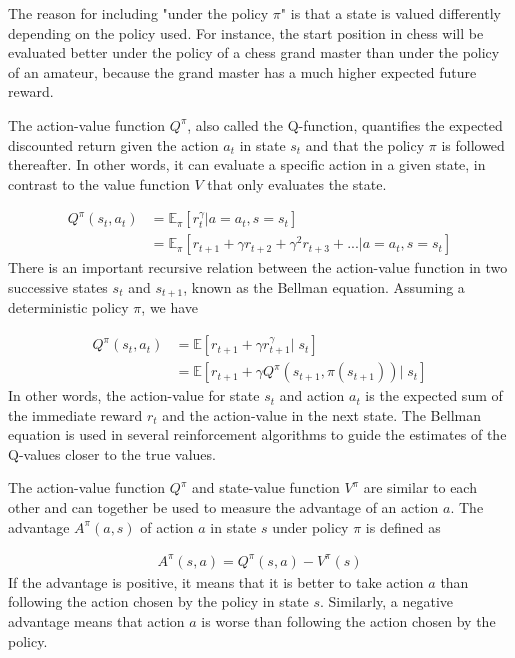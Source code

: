 \documentclass[class=book, crop=false, 11pt]{standalone}
\begin{document}
The reason for including "under the policy $\pi$" is that a state is valued differently depending on the policy used. For instance, the start position in chess will be evaluated better under the policy of a chess grand master than under the policy of an amateur, because the grand master has a much higher expected future reward. 



The action-value function $Q^{\pi}$, also called the Q-function, quantifies the expected discounted return given the action $a_{t}$ in state $s_{t}$ and that the policy $\pi$ is followed thereafter. In other words, it can evaluate a specific action in a given state, in contrast to the value function $V$ that only evaluates the state.

\begin{equation}
   \begin{aligned}\label{eq:theory:action_value_function}
Q^{\pi}(s_{t},a_{t}) 
&= \mathbb{E}_{\pi}[r^{\gamma}_{t}|a=a_{t} ,s=s_{t}]
\\
&= \mathbb{E}_{\pi}[ r_{t+1} + \gamma r_{t+2} + \gamma^{2} r_{t+3} + ...|a=a_{t} ,s=s_{t}]
\end{aligned} 
\end{equation}
There is an important recursive relation between the action-value function in two successive states $s_{t}$ and $s_{t+1}$, known as the Bellman equation. Assuming a deterministic policy $\pi$, we have

\begin{equation}
   \begin{aligned}\label{eq:theory:bellman_equation}
Q^{\pi}(s_{t},a_{t}) 
&= \mathbb{E}[r_{t+1} +\gamma r^{\gamma}_{t+1} |\; s_{t}] \\
& = \mathbb{E}[r_{t+1} +\gamma Q^{\pi}(s_{t+1},\pi(s_{t+1}))|\; s_{t}]
\end{aligned} 
\end{equation}
In other words, the action-value for state $s_{t}$ and action $a_{t}$ is the expected sum of the immediate reward $r_{t}$ and the action-value in the next state. The Bellman equation is used in several reinforcement algorithms to guide the estimates of the Q-values closer to the true values.

The action-value function $Q^{\pi}$ and state-value function $V^{\pi}$ are similar to each other and can together be used to measure the advantage of an action $a$. The advantage $A^{\pi}(a,s)$ of action $a$ in state $s$ under policy $\pi$ is defined as 

\begin{equation}
   \begin{aligned}\label{eq:theory:advantage_function}
A^{\pi}(s,a) =  Q^{\pi}(s,a) - V^{\pi}(s)
\end{aligned} 
\end{equation}
If the advantage is positive, it means that it is better to take action $a$ than following the action chosen by the policy in state $s$. Similarly, a negative advantage means that action $a$ is worse than following the action chosen by the policy.
\end{document}
